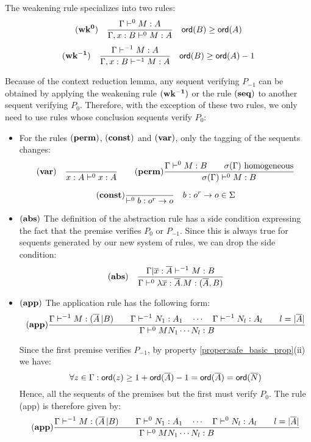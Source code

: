 The weakening rule specializes into two rules:
$$ \mathbf{(wk^{0})} \quad  \frac{\displaystyle \Gamma \vdash^{0} M : A}{\Gamma , x : B \vdash^{0} M : A} \quad {\sf ord}(B) \geq {\sf ord}(A) $$
$$ \mathbf{(wk^{-1})} \quad  \frac{\displaystyle \Gamma \vdash^{-1} M : A}{\Gamma , x : B \vdash^{-1} M : A} \quad {\sf ord}(B) \geq {\sf ord}(A) -1$$

Because of the context reduction lemma, any sequent verifying $P_{-1}$ can be obtained
by applying the weakening rule $\mathbf{(wk^{-1})}$ or the rule $\mathbf{(seq)}$ to another sequent
verifying $P_0$. Therefore, with the exception of these two rules, we only need to use rules
whose conclusion sequents verify $P_0$:
\begin{itemize}
\item For the rules $\mathbf{(perm)}$, $\mathbf{(const)}$ and $\mathbf{(var)}$, only the tagging of the sequents
changes:
$$ \mathbf{(var)} \quad  \frac{\displaystyle }{x : A\vdash^{0} x : A}
\qquad
  \mathbf{(perm)} \frac{\displaystyle 
      { \Gamma \vdash^0 M:B \qquad \sigma(\Gamma)  } \hbox{ homogeneous}
    }{ \sigma(\Gamma) \vdash^0 M : B }
$$

$$ \mathbf{(const)}
    \frac{\displaystyle }{ \vdash^0 b : o^r \rightarrow o} \quad b : o^r \rightarrow o \in \Sigma
$$

\item $\mathbf{(abs)}$ The definition of the abstraction rule has a side condition
expressing the fact that the premise verifies $P_0$ or $P_{-1}$. Since this is always true for sequents
generated by our new system of rules, we can drop the side condition:
$$ \mathbf{(abs)} \quad  \frac{\displaystyle \Gamma | \overline{x} : \overline{A} \vdash^{-1} M : B}{\Gamma  \vdash^{0} \lambda \overline{x} : \overline{A} . M : (\overline{A},B)}$$


\item $\mathbf{(app)}$ The application rule has the following form:
$$ \mathbf{(app)}
    \frac{\displaystyle 
        { \Gamma \vdash^{-1} M : (\overline{A} \, | B)
        \qquad
        \Gamma \vdash^{-1} N_1 : A_1 \quad \cdots \quad \Gamma \vdash^{-1} N_{l} : A_l \qquad l = |\overline{A}|
        }
    }{
        \Gamma \vdash^0 M N_1 \cdots N_{l} : B
    }
$$

Since the first premise verifies $P_{-1}$, by property \ref{proper:safe_basic_prop}(ii) we have:
$$\forall z \in \Gamma : {\sf ord}(z) \geq 1 + {\sf ord}(\overline{A}) -1 = {\sf ord}(\overline{A}) = {\sf ord}(\overline{N})$$
Hence, all the sequents of the premises but the first must verify $P_0$. The rule (app) is therefore given by:
$$ \mathbf{(app)}
    \frac{\displaystyle 
        { \Gamma \vdash^{-1} M : (\overline{A} \, | B)
        \qquad
        \Gamma \vdash^0 N_1 : A_1 \quad \cdots \quad \Gamma \vdash^0 N_{l} : A_l \qquad l = |\overline{A}|
        }
    }{
        \Gamma \vdash^0 M N_1 \cdots N_{l} : B
      }
$$


\end{itemize}
